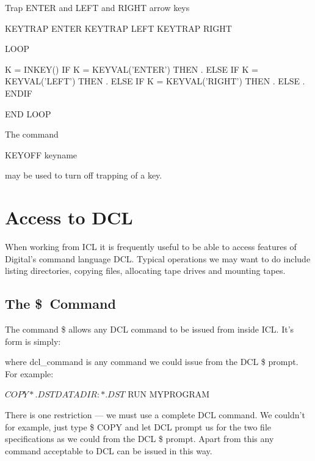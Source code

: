 \documentclass[twoside,11pt,nolof,chapters]{starlink}
\begin{document}
\begin{terminalv}

{  Trap ENTER and LEFT and RIGHT arrow keys  }

    KEYTRAP ENTER
    KEYTRAP LEFT
    KEYTRAP RIGHT

    LOOP

      K = INKEY()
      IF K = KEYVAL('ENTER') THEN
      .
      ELSE IF K = KEYVAL('LEFT') THEN
      .
      ELSE IF K = KEYVAL('RIGHT') THEN
      .
      ELSE
      .
      ENDIF

    END LOOP

\end{terminalv}

The command
\begin{terminalv}

 KEYOFF keyname

\end{terminalv}
 may be used to turn off trapping of a key.


\chapter{Access to DCL}
When working from ICL it is frequently useful to be able to access features of
Digital's command language DCL.
Typical operations we may want to do include listing directories, copying
files, allocating tape drives and mounting tapes.

\section{The \$\ Command}
The command \$ allows any DCL command to be issued from inside ICL. It's
form is simply:
where dcl\_command is any command we could issue from the DCL \$ prompt.
For example:

\begin{terminalv}

    $ COPY *.DST DATADIR:*.DST
    $ RUN MYPROGRAM

\end{terminalv}
There is one restriction --- we must use a complete DCL command. We couldn't
for example, just type \$ COPY and let DCL prompt us for the two file
specifications as we could from the DCL \$ prompt. Apart from this any
command acceptable to DCL can be issued in this way.
\end{document}
